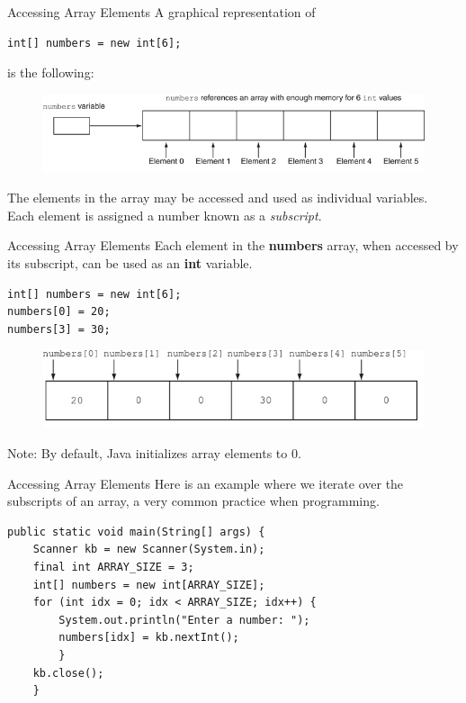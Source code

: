 \documentclass[11pt]{beamer}
\begin{document}
\begin{frame}[fragile]{Accessing Array Elements}
    A graphical representation of
    \begin{lstlisting}  
int[] numbers = new int[6];
    \end{lstlisting}
    is the following:
    \noindent 
    \begin{figure}[H]
    \centering
    \includegraphics[scale=0.7]{Images/chapter07_arrayExample.png}
    \end{figure}
    The elements in the array may be accessed and used as individual variables.  \\ \vspace{1em}
    Each element is assigned a number known as a \textit{subscript}. \\ \vspace{1em}
\end{frame}

\begin{frame}[fragile]{Accessing Array Elements}
    Each element in the \textbf{numbers} array, when accessed by its subscript, can be used as an \textbf{int} variable.
    \begin{lstlisting}
int[] numbers = new int[6];
numbers[0] = 20;
numbers[3] = 30;
    \end{lstlisting}
    \noindent 
    \begin{figure}[H]
    \centering
    \includegraphics[scale=0.7]{Images/chapter07_accessingArray.png}
    \end{figure}
Note: By default, Java initializes array elements to 0.
\end{frame}

\begin{frame}[fragile]{Accessing Array Elements}
Here is an example where we iterate over the subscripts of an array, a very common practice when programming.
    \begin{lstlisting}
public static void main(String[] args) {
    Scanner kb = new Scanner(System.in);
    final int ARRAY_SIZE = 3;
    int[] numbers = new int[ARRAY_SIZE];
    for (int idx = 0; idx < ARRAY_SIZE; idx++) {
        System.out.println("Enter a number: ");
        numbers[idx] = kb.nextInt();
        }
    kb.close();
    }
    \end{lstlisting}
\end{frame}
\end{document}
